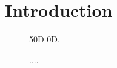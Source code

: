 \section{Introduction}
\lipsum[5]




\begin{figure}[h]
	\centering
    
	\caption{50D 0D.}
	\label{fig:controllerboardv2_}
\end{figure}


\begin{figure}[h]
	\centering
    
	\caption{....}
	\label{fig:controllerboardv2_}
\end{figure}